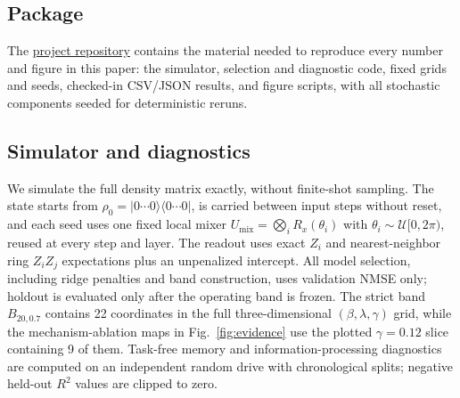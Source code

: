 \documentclass[10pt,conference]{IEEEtran}
\begin{document}
\subsection{Package}
The \href{https://github.com/eybmits/qrc-operating-band}{\textcolor{repoLinkBlue}{project repository}} contains the material needed to reproduce every number and figure in this paper: the simulator, selection and diagnostic code, fixed grids and seeds, checked-in CSV/JSON results, and figure scripts, with all stochastic components seeded for deterministic reruns.

\subsection{Simulator and diagnostics}
We simulate the full density matrix exactly, without finite-shot sampling. The state starts from $\rho_0=|0\cdots0\rangle\langle0\cdots0|$, is carried between input steps without reset, and each seed uses one fixed local mixer $U_{\mathrm{mix}}=\bigotimes_i R_x(\theta_i)$ with $\theta_i\sim\mathcal{U}[0,2\pi)$, reused at every step and layer. The readout uses exact $Z_i$ and nearest-neighbor ring $Z_iZ_j$ expectations plus an unpenalized intercept. All model selection, including ridge penalties and band construction, uses validation NMSE only; holdout is evaluated only after the operating band is frozen. The strict band $B_{20,0.7}$ contains 22 coordinates in the full three-dimensional $(\beta,\lambda,\gamma)$ grid, while the mechanism-ablation maps in Fig.~\ref{fig:evidence} use the plotted $\gamma=0.12$ slice containing 9 of them. Task-free memory and information-processing diagnostics are computed on an independent random drive with chronological splits; negative held-out $R^2$ values are clipped to zero.
\end{document}
